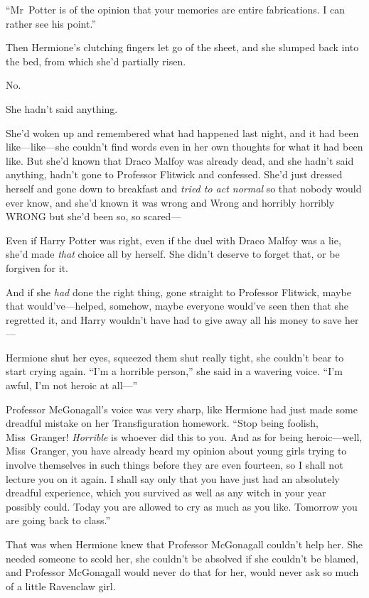 “Mr~Potter is of the opinion that your memories are entire fabrications. I can rather see his point.”

Then Hermione’s clutching fingers let go of the sheet, and she slumped back into the bed, from which she’d partially risen.

No.

She hadn’t said anything.

She’d woken up and remembered what had happened last night, and it had been like—like—she couldn’t find words even in her own thoughts for what it had been like. But she’d known that Draco Malfoy was already dead, and she hadn’t said anything, hadn’t gone to Professor Flitwick and confessed. She’d just dressed herself and gone down to breakfast and \emph{tried to act normal} so that nobody would ever know, and she’d known it was wrong and Wrong and horribly horribly WRONG but she’d been so, so scared—

Even if Harry Potter was right, even if the duel with Draco Malfoy was a lie, she’d made \emph{that} choice all by herself. She didn’t deserve to forget that, or be forgiven for it.

And if she \emph{had} done the right thing, gone straight to Professor Flitwick, maybe that would’ve—helped, somehow, maybe everyone would’ve seen then that she regretted it, and Harry wouldn’t have had to give away all his money to save her—

Hermione shut her eyes, squeezed them shut really tight, she couldn’t bear to start crying again. “I’m a horrible person,” she said in a wavering voice. “I’m awful, I’m not heroic at all—”

Professor McGonagall’s voice was very sharp, like Hermione had just made some dreadful mistake on her Transfiguration homework. “Stop being foolish, Miss~Granger! \emph{Horrible} is whoever did this to you. And as for being heroic—well, Miss~Granger, you have already heard my opinion about young girls trying to involve themselves in such things before they are even fourteen, so I shall not lecture you on it again. I shall say only that you have just had an absolutely dreadful experience, which you survived as well as any witch in your year possibly could. Today you are allowed to cry as much as you like. Tomorrow you are going back to class.”

That was when Hermione knew that Professor McGonagall couldn’t help her. She needed someone to scold her, she couldn’t be absolved if she couldn’t be blamed, and Professor McGonagall would never do that for her, would never ask so much of a little Ravenclaw girl.

